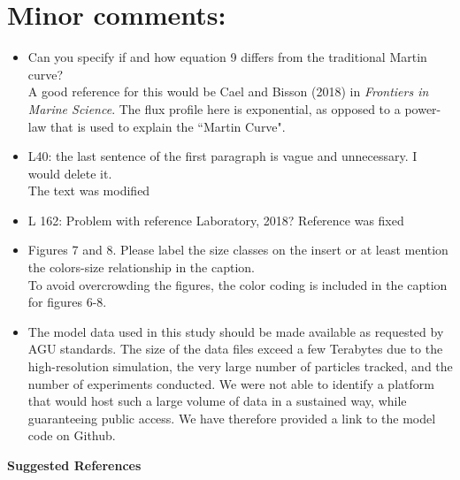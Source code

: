 \documentclass[12pt,letter]{article}
\begin{document}
\section*{Minor comments:}
\begin{itemize}
	\item Can you specify if and how equation 9 differs from the traditional Martin curve?\\
	{\color{blue} A good reference for this would be Cael and Bisson (2018) in \textit{Frontiers in Marine Science}. The flux profile here is exponential, as opposed to a power-law that is used to explain the ``Martin Curve".}


	\item L40: the last sentence of the first paragraph is vague and unnecessary. I would delete it.\\
	{\color{blue} The text was modified\\}
	\item L 162: Problem with reference Laboratory, 2018?
	{\color{blue} Reference was fixed\\}
	\item Figures 7 and 8. Please label the size classes on the insert or at least mention the colors-size relationship in the caption.\\
	{\color{blue} To avoid overcrowding the figures, the color coding is included in the caption for figures 6-8.\\}


	\item The model data used in this study should be made available as requested by AGU standards.
	{\color{blue} The size of the data files exceed a few Terabytes due to the high-resolution simulation,  the very large number of particles tracked, and the number of experiments conducted. We were not able to identify a platform that would host such a large volume of data in a sustained way, while guaranteeing public access. We have therefore provided a link to the model code on Github.\\}
\end{itemize}

{\bf Suggested References}\\
\end{document}
